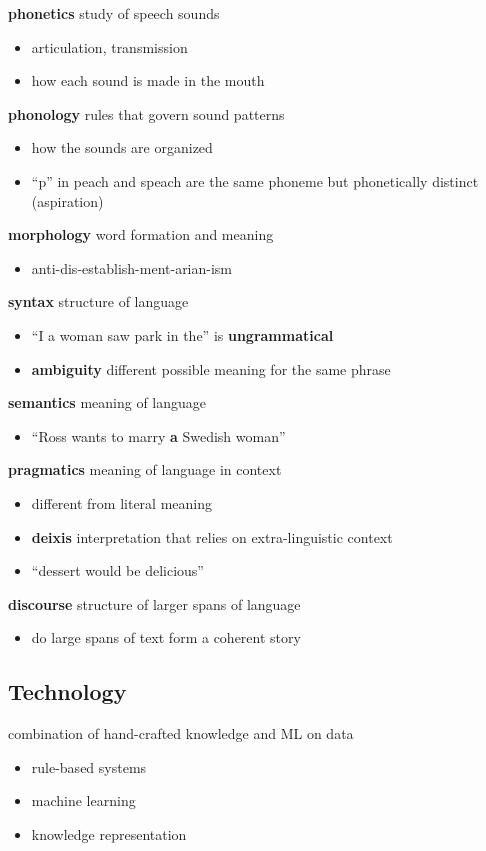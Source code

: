 \documentclass[]{article}
\theoremstyle{definition}
\begin{document}
    \textbf{phonetics} study of speech sounds
    \begin{itemize}
        \item articulation, transmission
        \item how each sound is made in the mouth
    \end{itemize}
    \textbf{phonology} rules that govern sound patterns
    \begin{itemize}
        \item how the sounds are organized
        \item ``p'' in peach and speach are the same phoneme but phonetically distinct (aspiration)
    \end{itemize}
    \textbf{morphology} word formation and meaning
    \begin{itemize}
        \item anti-dis-establish-ment-arian-ism
    \end{itemize}
    \textbf{syntax} structure of language
    \begin{itemize}
        \item ``I a woman saw park in the'' is \textbf{ungrammatical}
        \item \textbf{ambiguity} different possible meaning for the same phrase
    \end{itemize}
    \textbf{semantics} meaning of language
    \begin{itemize}
        \item ``Ross wants to marry \textbf{a} Swedish woman''
    \end{itemize}
    \textbf{pragmatics} meaning of language in context
    \begin{itemize}
        \item different from literal meaning
        \item \textbf{deixis} interpretation that relies on extra-linguistic context
        \item ``dessert would be delicious''
    \end{itemize}
    \textbf{discourse} structure of larger spans of language
    \begin{itemize}
        \item do large spans of text form a coherent story
    \end{itemize}

    \subsection{Technology}%
    \label{sub:technology}

    combination of hand-crafted knowledge and ML on data
    \begin{itemize}
        \item rule-based systems
        \item machine learning
        \item knowledge representation
    \end{itemize}
\end{document}
